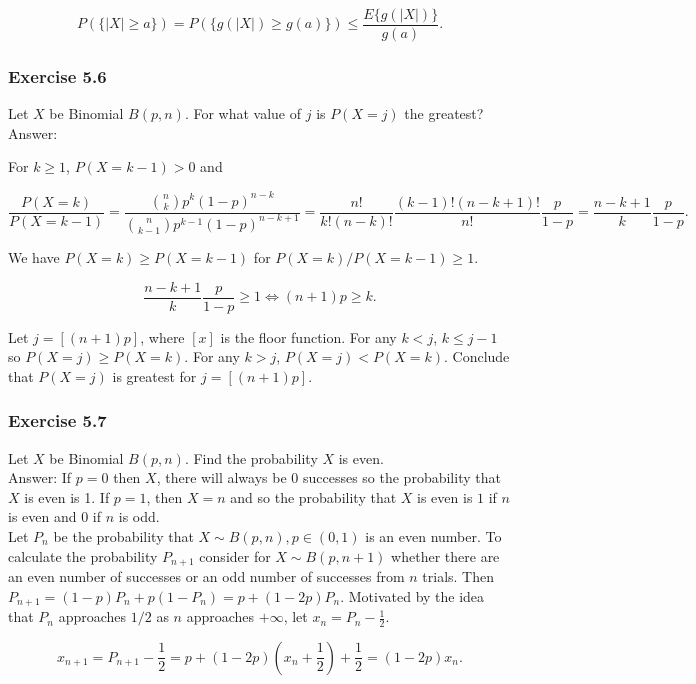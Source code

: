 \documentclass{article}
\begin{document}
{$$
P(\{|X| \geq a \}) = P(\{g(|X|) \geq g(a)\}) \leq \frac{E\{g(|X|)\}}{g(a)}.
$$


\subsubsection*{Exercise 5.6}

Let $X$ be Binomial $B(p, n)$. For what value of $j$ is $P(X = j)$ the greatest?\\

Answer:

For $k \geq 1$, $P(X = k -1) > 0$ and

$$
\frac{P(X = k)}{P(X = k-1)}
= \frac{\binom{n}{k}p^k(1-p)^{n-k}}{\binom{n}{k-1}p^{k-1}(1-p)^{n-k+1}}
= \frac{n!}{k!(n-k)!}\frac{(k-1)!(n-k+1)!}{n!}\frac{p}{1-p}
= \frac{n-k+1}{k}\frac{p}{1-p}.
$$

We have $P(X = k) \geq P(X = k-1)$ for $P(X=k) / P(X = k-1) \geq 1$.

$$
\frac{n-k+1}{k}\frac{p}{1-p} \geq 1 \iff (n+1)p \geq k.
$$

Let $j = [(n+1)p]$, where $[x]$ is the floor function. For any $k < j$, $k \leq j-1$ so $P(X = j) \geq P(X = k)$. For any $k > j$, $P(X = j) < P(X = k)$. Conclude that $P(X = j)$ is greatest for $j = [(n+1)p]$. 

\subsubsection*{Exercise 5.7}

Let $X$ be Binomial $B(p, n)$. Find the probability $X$ is even. \\

Answer: If $p = 0$ then $X$, there will always be 0 successes so the probability that $X$ is even is 1. If $p = 1$, then $X = n$ and so the probability that $X$ is even is $1$ if $n$ is even and $0$ if $n$ is odd. \\

Let $P_n$ be the probability that $X \sim B(p,n), p \in (0,1)$ is an even number. To calculate the probability $P_{n+1}$ consider for $X \sim B(p,n+1)$ whether there are an even number of successes or an odd number of successes from $n$ trials. Then $P_{n+1} = (1-p)P_n + p(1-P_n) = p + (1-2p)P_n$. Motivated by the idea that $P_n$ approaches $1/2$ as $n$ approaches $+\infty$, let $x_n  = P_n - \frac{1}{2}$. 

$$
x_{n+1} = P_{n+1} - \frac{1}{2} = p + (1-2p)(x_n + \frac{1}{2}) + \frac{1}{2} = (1-2p)x_n.
$$

}
\end{document}
